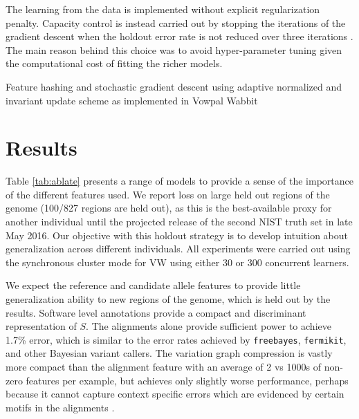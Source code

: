 \documentclass{article}
\newcommand{\w}{\mathbf{w}}
\newcommand{\x}{\mathbf{x}}
\newcommand{\R}{\mathbb{R}}
\newcommand{\tr}{{\!\top}}
\begin{document}
The learning from the data is implemented without explicit regularization penalty.
Capacity control is instead carried out by stopping the iterations of the gradient descent when the holdout error rate is not reduced over three iterations \citep{hardt2015train}.
The main reason behind this choice was to avoid hyper-parameter tuning given the computational cost of fitting the richer models.




Feature hashing and stochastic gradient descent using adaptive normalized and invariant update scheme as implemented in Vowpal Wabbit \cite{mcmahan2010adaptive, duchi2011adaptive, agarwal2014reliable} 


\section{Results}

Table \ref{tab:ablate} presents a range of models to provide a sense of the importance of the different features used.
We report loss on large held out regions of the genome (100/827 regions are held out), as this is the best-available proxy for another individual until the projected release of the second NIST truth set in late May 2016.
Our objective with this holdout strategy is to develop intuition about generalization across different individuals.
All experiments were carried out using the synchronous cluster mode for VW using either 30 or 300 concurrent learners.

We expect the reference and candidate allele features to provide little generalization ability to new regions of the genome, which is held out by the results.
Software level annotations provide a compact and discriminant representation of $S$.
The alignments alone provide sufficient power to achieve 1.7\% error, which is similar to the error rates achieved by {\tt freebayes}, {\tt fermikit}, and other Bayesian variant callers.
The variation graph compression is vastly more compact than the alignment feature with an average of 2 vs 1000s of non-zero features per example, but achieves only slightly worse performance, perhaps because it cannot capture context specific errors which are evidenced by certain motifs in the alignments \cite{nakamura2011sequence}.
\end{document}
